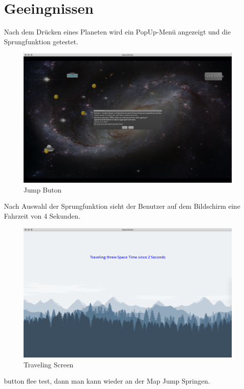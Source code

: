 \documentclass[11pt]{article}
\begin{document}
\section{Geeingnissen}
Nach dem Drücken eines Planeten wird ein PopUp-Menü angezeigt und die Sprungfunktion getestet.
\begin{figure}[htp]
\centering
\includegraphics[scale=0.3]{TestProtocolBilder/jump.png}
\caption{Jump Buton}
\end{figure}
\newpage
Nach Auswahl der Sprungfunktion sieht der Benutzer auf dem Bildschirm eine Fahrzeit von 4 Sekunden.
\begin{figure}[htp]
\centering
\includegraphics[scale=0.3]{TestProtocolBilder/traveling.png}
\caption{Traveling Screen}
\end{figure}
button flee test, dann man kann wieder an der Map Jump Springen.
\end{document}
